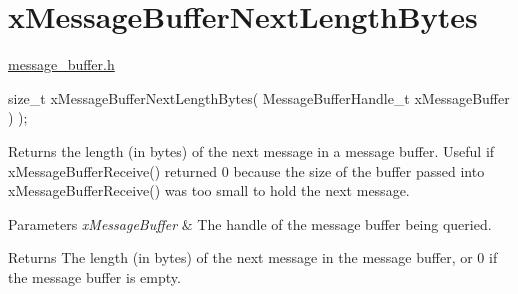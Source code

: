 \hypertarget{group__x_message_buffer_next_length_bytes}{}\section{x\+Message\+Buffer\+Next\+Length\+Bytes}
\label{group__x_message_buffer_next_length_bytes}
\mbox{\hyperlink{message__buffer_8h_source}{message\+\_\+buffer.\+h}} 
\begin{DoxyPre}
size\_t xMessageBufferNextLengthBytes( MessageBufferHandle\_t xMessageBuffer ) );
\end{DoxyPre}
 Returns the length (in bytes) of the next message in a message buffer. Useful if x\+Message\+Buffer\+Receive() returned 0 because the size of the buffer passed into x\+Message\+Buffer\+Receive() was too small to hold the next message.


\begin{DoxyParams}{Parameters}
{\em x\+Message\+Buffer} & The handle of the message buffer being queried.\\
\hline
\end{DoxyParams}
\begin{DoxyReturn}{Returns}
The length (in bytes) of the next message in the message buffer, or 0 if the message buffer is empty. 
\end{DoxyReturn}
